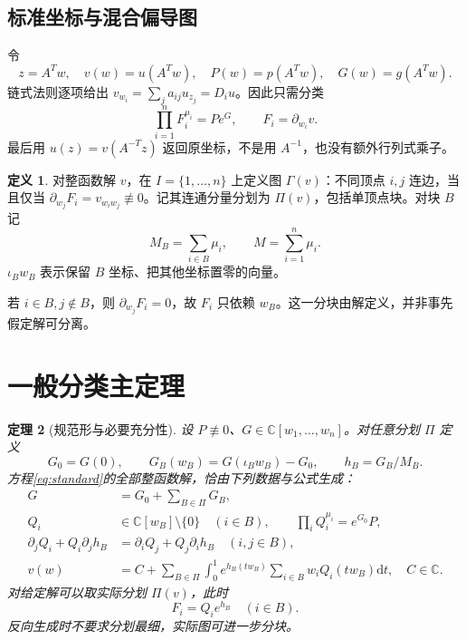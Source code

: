 \documentclass[UTF8,11pt,a4paper,fontset=fandol]{ctexart}
\newtheorem{theorem}{定理}[section]
\theoremstyle{definition}\newtheorem{definition}[theorem]{定义}
\theoremstyle{remark}\newtheorem{remark}[theorem]{注}
\newcommand{\C}{\mathbb C}\newcommand{\N}{\mathbb N}
\newcommand{\dd}{\mathrm d}\newcommand{\OO}{\mathcal O}
\begin{document}
\subsection{标准坐标与混合偏导图}
令
\begin{equation}\label{eq:change}
z=A^Tw,\quad v(w)=u(A^Tw),\quad P(w)=p(A^Tw),\quad G(w)=g(A^Tw).
\end{equation}
链式法则逐项给出 $v_{w_i}=\sum_j a_{ij}u_{z_j}=D_i u$。因此只需分类
\begin{equation}\label{eq:standard}
\prod_{i=1}^n F_i^{\mu_i}=Pe^G,\qquad F_i=\partial_{w_i}v.
\end{equation}
最后用 $u(z)=v(A^{-T}z)$ 返回原坐标，不是用 $A^{-1}$，也没有额外行列式乘子。

\begin{definition}
对整函数解 $v$，在 $I=\{1,\ldots,n\}$ 上定义图 $\Gamma(v)$：不同顶点 $i,j$ 连边，当且仅当 $\partial_{w_j}F_i=v_{w_iw_j}\not\equiv0$。记其连通分量分划为 $\Pi(v)$，包括单顶点块。对块 $B$ 记
\[
M_B=\sum_{i\in B}\mu_i,\qquad M=\sum_{i=1}^n\mu_i.
\]
$\iota_Bw_B$ 表示保留 $B$ 坐标、把其他坐标置零的向量。
\end{definition}
若 $i\in B,j\notin B$，则 $\partial_{w_j}F_i=0$，故 $F_i$ 只依赖 $w_B$。这一分块由解定义，并非事先假定解可分离。

\section{一般分类主定理}\label{sec:main}
\begin{theorem}[规范形与必要充分性]\label{thm:normal}
设 $P\not\equiv0$、$G\in\C[w_1,\ldots,w_n]$。对任意分划 $\Pi$ 定义
\begin{equation}\label{eq:phase}
G_0=G(0),\qquad G_B(w_B)=G(\iota_Bw_B)-G_0,
\qquad h_B=G_B/M_B.
\end{equation}
方程\eqref{eq:standard}的全部整函数解，恰由下列数据与公式生成：
\begin{align}
G&=G_0+\sum_{B\in\Pi}G_B,\label{eq:split}\\
Q_i&\in\C[w_B]\setminus\{0\}\quad (i\in B),\qquad
\prod_iQ_i^{\mu_i}=e^{G_0}P,\label{eq:qproduct}\\
\partial_jQ_i+Q_i\partial_jh_B
&=\partial_iQ_j+Q_j\partial_ih_B\quad(i,j\in B),\label{eq:closed}\\
v(w)&=C+\sum_{B\in\Pi}\int_0^1 e^{h_B(tw_B)}
\sum_{i\in B}w_iQ_i(tw_B)\dd t,\quad C\in\C.\label{eq:radial}
\end{align}
对给定解可以取实际分划 $\Pi(v)$，此时
\begin{equation}\label{eq:Fi}
F_i=Q_i e^{h_B}\quad(i\in B).
\end{equation}
反向生成时不要求分划最细，实际图可进一步分块。
\end{theorem}
\end{document}

